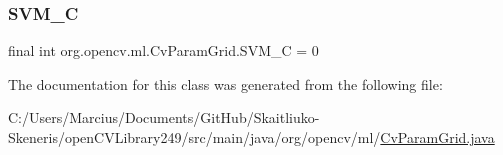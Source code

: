 \mbox{\label{classorg_1_1opencv_1_1ml_1_1_cv_param_grid_addeb58a617bc6516e19cd763cacdb633}} 
\subsubsection{\texorpdfstring{S\+V\+M\+\_\+C}{SVM\_C}}
{\footnotesize\ttfamily final int org.\+opencv.\+ml.\+Cv\+Param\+Grid.\+S\+V\+M\+\_\+C = 0\hspace{0.3cm}{\ttfamily [static]}}



The documentation for this class was generated from the following file\+:\begin{DoxyCompactItemize}
\item 
C\+:/\+Users/\+Marcius/\+Documents/\+Git\+Hub/\+Skaitliuko-\/\+Skeneris/open\+C\+V\+Library249/src/main/java/org/opencv/ml/\mbox{\hyperlink{_cv_param_grid_8java}{Cv\+Param\+Grid.\+java}}\end{DoxyCompactItemize}
